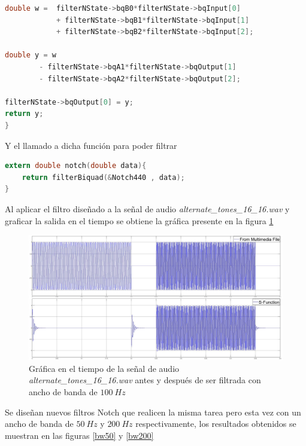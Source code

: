 \begin{enumerate}
\begin{lstlisting}[language = C]
double w =  filterNState->bqB0*filterNState->bqInput[0]
            + filterNState->bqB1*filterNState->bqInput[1]
            + filterNState->bqB2*filterNState->bqInput[2];
    
double y = w
        - filterNState->bqA1*filterNState->bqOutput[1]
        - filterNState->bqA2*filterNState->bqOutput[2];
    
filterNState->bqOutput[0] = y;
return y;
}
    \end{lstlisting}
    
    
Y el llamado a dicha función para poder filtrar

\begin{lstlisting}[language = C]
extern double notch(double data){
    return filterBiquad(&Notch440 , data);
}
\end{lstlisting}

Al aplicar el filtro diseñado a la señal de audio \textit{alternate\_tones\_16\_16.wav} y graficar la salida en el tiempo se obtiene la gráfica presente en la figura \ref{alternate100}

\begin{figure}[H]
    \centering
    \includegraphics[scale = 0.2]{Figuras/p6_1- alternate_tones_bw100.jpg}
    \caption{Gráfica  en el tiempo de la señal de audio \textit{alternate\_tones\_16\_16.wav} antes y después de ser filtrada con ancho de banda de $100~Hz$}
    \label{alternate100}
\end{figure}



Se diseñan nuevos filtros Notch que realicen la misma tarea pero esta vez con un ancho de banda de $50~Hz$ y $200~Hz$ respectivamente, los resultados obtenidos se muestran en las figuras  \ref{bw50} y \ref{bw200}



\end{enumerate}
